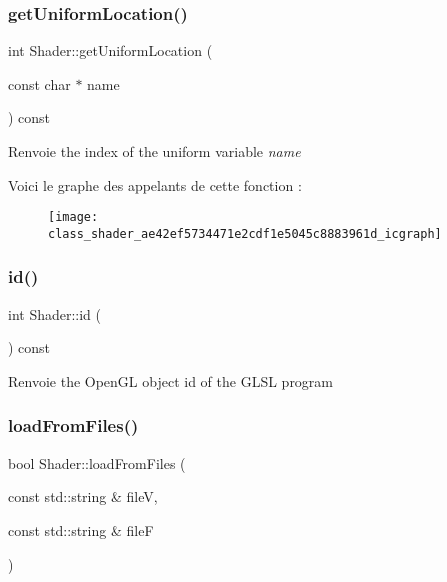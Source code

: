 \subsubsection{\texorpdfstring{get\+Uniform\+Location()}{getUniformLocation()}}
{\footnotesize\ttfamily int Shader\+::get\+Uniform\+Location (\begin{DoxyParamCaption}\item[{const char $\ast$}]{name }\end{DoxyParamCaption}) const}

\begin{DoxyReturn}{Renvoie}
the index of the uniform variable {\itshape name} 
\end{DoxyReturn}
Voici le graphe des appelants de cette fonction \+:\nopagebreak
\begin{figure}[H]
\begin{center}
\leavevmode
\texttt{[image: class\_shader\_ae42ef5734471e2cdf1e5045c8883961d\_icgraph]}
\end{center}
\end{figure}
\mbox{\label{class_shader_ac6f8837bdac2997de1a79c9a518c664c}} 
\subsubsection{\texorpdfstring{id()}{id()}}
{\footnotesize\ttfamily int Shader\+::id (\begin{DoxyParamCaption}{ }\end{DoxyParamCaption}) const\hspace{0.3cm}{\ttfamily [inline]}}

\begin{DoxyReturn}{Renvoie}
the Open\+GL object id of the G\+L\+SL program 
\end{DoxyReturn}
\mbox{\label{class_shader_ab3326b4493672d0e456e05d9b64c7b28}} 
\subsubsection{\texorpdfstring{load\+From\+Files()}{loadFromFiles()}}
{\footnotesize\ttfamily bool Shader\+::load\+From\+Files (\begin{DoxyParamCaption}\item[{const std\+::string \&}]{fileV,  }\item[{const std\+::string \&}]{fileF }\end{DoxyParamCaption})}

